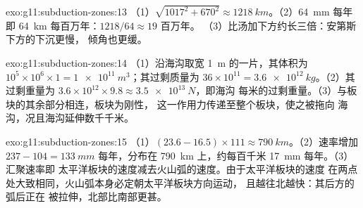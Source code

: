 \begin{solution}{exo:g11:subduction-zones:13}
（1）$\sqrt{1017^2 + 670^2} \approx \qty{1218}{km}$。（2）\qty{64}{mm} 每年
即 \qty{64}{km} 每百万年：$1218/64 \approx 19$ 百万年。
（3）比汤加下方约长三倍：安第斯下方的下沉更慢，
倾角也更缓。
\end{solution}

\begin{solution}{exo:g11:subduction-zones:14}
（1）沿海沟取宽 \qty{1}{m} 的一片，其体积为
$10^5 \times 10^6 \times 1 = \qty{1e11}{m^3}$；其过剩质量为
$36 \times 10^{11} = \qty{3.6e12}{kg}$。（2）其过剩重量为
$3.6 \times 10^{12} \times 9.8 \approx \qty{3.5e13}{N}$，即海沟
每米的过剩重量。（3）与板块的其余部分相连，板块为刚性，
这一作用力传递至整个板块，使之被拖向
海沟，况且海沟延伸数千千米。
\end{solution}

\begin{solution}{exo:g11:subduction-zones:15}
（1）$(23.6 - 16.5) \times 111 \approx \qty{790}{km}$。（2）速率增加
$237 - 104 = \qty{133}{mm}$ 每年，分布在 \qty{790}{km} 上，约每百千米
\qty{17}{mm} 每年。（3）汇聚速率即
太平洋板块的速度减去火山弧的速度。由于太平洋板块的速度
在两点处大致相同，火山弧本身必定朝太平洋板块方向运动，
且越往北越快：其后方的弧后正在
被拉伸，北部比南部更甚。
\end{solution}


